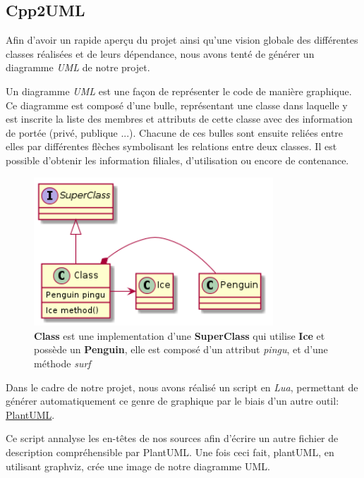 \subsection{Cpp2UML}

Afin d'avoir un rapide aperçu du projet ainsi qu'une vision globale des différentes classes réalisées et de leurs dépendance,
nous avons tenté de générer un diagramme \textit{UML} de notre projet.

Un diagramme \textit{UML} est une façon de représenter le code de manière graphique.
Ce diagramme est composé d'une bulle, représentant une classe dans laquelle y est inscrite la liste des membres et attributs de cette classe avec des information de portée (privé, publique ...).
Chacune de ces bulles sont ensuite reliées entre elles par différentes flèches symbolisant les relations entre deux classes. Il est possible d'obtenir les information filiales, d'utilisation ou encore de contenance.

\begin{figure}[h!]
	\centering
	\includegraphics[width=0.8\textwidth]{img/uml_example.png}
	\caption{\textbf{Class} est une implementation d'une \textbf{SuperClass} qui utilise \textbf{Ice} et possède un \textbf{Penguin}, elle est composé d'un attribut \textit{pingu}, et d'une méthode \textit{surf}}
\end{figure}
\pagebreak
Dans le cadre de notre projet, nous avons réalisé un script en \textit{Lua},
permettant de générer automatiquement ce genre de graphique par le biais d'un autre outil:
\href{http://plantuml.sourceforge.net/}{PlantUML}.

Ce script annalyse les en-têtes de nos sources afin d'écrire un autre fichier de description compréhensible par PlantUML. Une fois ceci fait,  plantUML, en utilisant graphviz, crée une image de notre diagramme UML.
